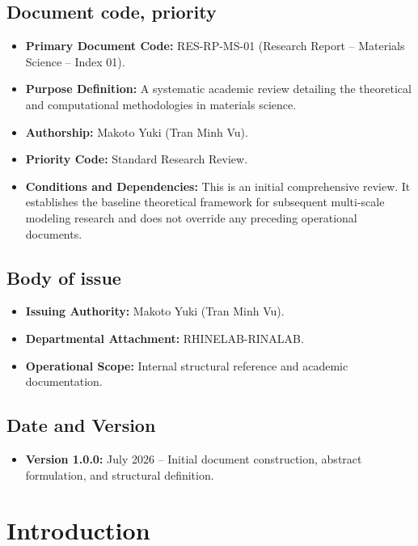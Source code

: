 \documentclass[10pt,a4paper]{article}
\begin{document}
\subsection{Document code, priority}

\begin{itemize}[topsep=1pt,itemsep=1pt]
    \item \textbf{Primary Document Code:} RES-RP-MS-01 (Research Report -- Materials Science -- Index 01).
    \item \textbf{Purpose Definition:} A systematic academic review detailing the theoretical and computational methodologies in materials science.
    \item \textbf{Authorship:} Makoto Yuki (Tran Minh Vu).
    \item \textbf{Priority Code:} Standard Research Review.
    \item \textbf{Conditions and Dependencies:} This is an initial comprehensive review. It establishes the baseline theoretical framework for subsequent multi-scale modeling research and does not override any preceding operational documents.
\end{itemize}

\subsection{Body of issue}

\begin{itemize}[topsep=1pt,itemsep=1pt]
    \item \textbf{Issuing Authority:} Makoto Yuki (Tran Minh Vu).
    \item \textbf{Departmental Attachment:} RHINELAB-RINALAB.
    \item \textbf{Operational Scope:} Internal structural reference and academic documentation.
\end{itemize}

\subsection{Date and Version}

\begin{itemize}[topsep=1pt,itemsep=1pt]
    \item \textbf{Version 1.0.0:} July 2026 -- Initial document construction, abstract formulation, and structural definition.
\end{itemize}

\section{Introduction}
\label{sec:intro}
\end{document}
